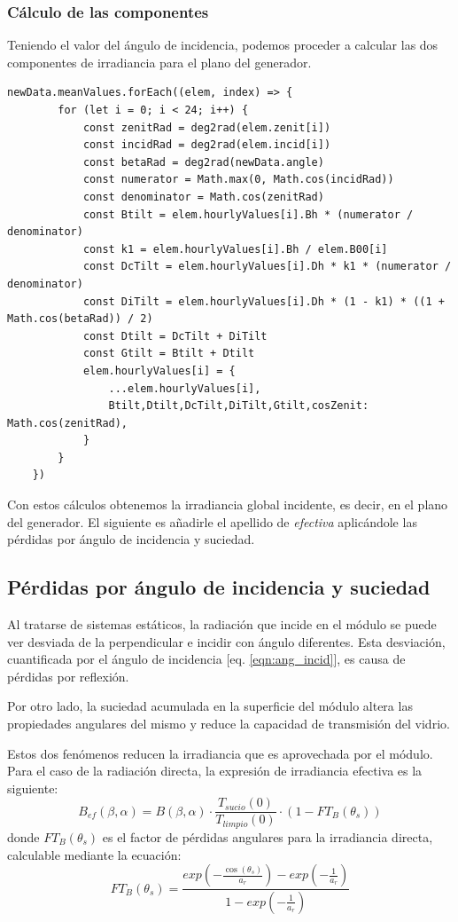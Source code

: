 \subsubsection{Cálculo de las componentes}

Teniendo el valor del ángulo de incidencia, podemos proceder a calcular las dos componentes de irradiancia para el plano del generador.

\begin{lstlisting}[style=ES6, caption={Cálculo del ángulo de incidencia}]
newData.meanValues.forEach((elem, index) => {
		for (let i = 0; i < 24; i++) {
			const zenitRad = deg2rad(elem.zenit[i])
			const incidRad = deg2rad(elem.incid[i])
			const betaRad = deg2rad(newData.angle)
			const numerator = Math.max(0, Math.cos(incidRad))
			const denominator = Math.cos(zenitRad)
			const Btilt = elem.hourlyValues[i].Bh * (numerator / denominator)
			const k1 = elem.hourlyValues[i].Bh / elem.B00[i]
			const DcTilt = elem.hourlyValues[i].Dh * k1 * (numerator / denominator)
			const DiTilt = elem.hourlyValues[i].Dh * (1 - k1) * ((1 + Math.cos(betaRad)) / 2)
			const Dtilt = DcTilt + DiTilt
			const Gtilt = Btilt + Dtilt
			elem.hourlyValues[i] = {
				...elem.hourlyValues[i],
				Btilt,Dtilt,DcTilt,DiTilt,Gtilt,cosZenit: Math.cos(zenitRad),
			}
		}
	})
\end{lstlisting}

Con estos cálculos obtenemos la irradiancia global incidente, es decir, en el plano del generador. El siguiente es añadirle el apellido de \textit{efectiva} aplicándole las pérdidas por ángulo de incidencia y suciedad.

\subsection{Pérdidas por ángulo de incidencia y suciedad}
\label{section:3.5.3}

Al tratarse de sistemas estáticos, la radiación que incide en el módulo se puede ver desviada de la perpendicular e incidir con ángulo diferentes. Esta desviación, cuantificada por el ángulo de incidencia [eq. \ref{eqn:ang_incid}], es causa de pérdidas por reflexión.

Por otro lado, la suciedad acumulada en la superficie del módulo altera las propiedades angulares del mismo y reduce la capacidad de transmisión del vidrio.

Estos dos fenómenos reducen la irradiancia que es aprovechada por el módulo. Para el caso de la radiación directa, la expresión de irradiancia efectiva es la siguiente:
\begin{equation}
B_{ef}(\beta, \alpha)= B(\beta,\alpha)\cdot\frac{T_{sucio}(0)}{T_{limpio}(0)}\cdot(1-FT_B(\theta_s))
\end{equation}
donde $FT_B(\theta_s)$ es el factor de pérdidas angulares para la irradiancia directa, calculable mediante la ecuación:
\begin{equation}
FT_B(\theta_s) = \frac{exp(-\frac{\cos(\theta_s)}{a_r})-exp(-\frac{1}{a_r})}{1-exp(-\frac{1}{a_r})}
\end{equation}


